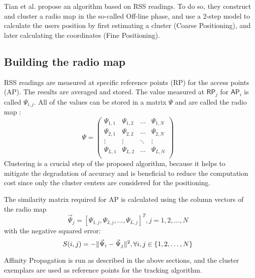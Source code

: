 \documentclass[11pt,a4paper]{article}
\DeclarePairedDelimiter\norm{\lVert}{\rVert}
\begin{document}
Tian et al. propose an algorithm based on RSS readings. To do so, they construct and cluster a radio map in the so-called Off-line phase, and use a 2-step model to calculate the users position by first estimating a cluster (Coarse Positioning), and later calculating the coordinates (Fine Positioning). \cite{tian2013fingerprint}
\subsection{Building the radio map}
RSS readings are measured at specific reference points (RP) for the access points (AP). The results are averaged and stored. The value measured at $\mathsf{RP}_j$ for $\mathsf{AP}_i$ is called $\Psi_{i,j}$. All of the values can be stored in a matrix $\Psi$ and are called the radio map \cite{tian2013fingerprint}:
\[\Psi = 
\left( \begin{array}{cccc}
\Psi_{1,1} & \Psi_{1,2} & \dots & \Psi_{1,N} \\                                              
\Psi_{2,1} & \Psi_{2,2} & \dots & \Psi_{2,N} \\
\vdots & \vdots & \ddots & \vdots \\
\Psi_{L,1} & \Psi_{L,2} & \dots & \Psi_{L,N} \\                                        
\end{array}\right)
\]
Clustering is a crucial step of the proposed algorithm, because it helps to mitigate the degradation of accuracy and is beneficial to reduce the computation cost since only the cluster centers are considered for the positioning. \cite{tian2013fingerprint}

The similarity matrix required for AP is calculated using the column vectors of the radio map
\[
\vec{\Psi}_j = \left[\Psi_{1,j}, \Psi_{2,j}, \dots , \Psi_{L,j}\right]^T, j=1,2,\dots , N
\]
with the negative squared error:
\[
S(i,j) = -\norm{\vec{\Psi}_i - \vec{\Psi}_j}^2, \forall i,j \in \{ 1,2,\dots , N \}
\]

Affinity Propagation is run as described in the above sections, and the cluster exemplars are used as reference points for the tracking algorithm. \cite{tian2013fingerprint}
\end{document}
